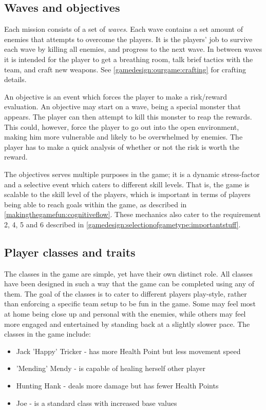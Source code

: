 \subsection{Waves and objectives}\label{gamedesign:ourgame:objectives}
Each mission consists of a set of \emph{waves}. Each wave contains a set amount of enemies that attempts to overcome the players. It is the players' job to survive each wave by killing all enemies, and progress to the next wave. In between waves it is intended for the player to get a breathing room, talk brief tactics with the team, and craft new weapons. See \ref{gamedesign:ourgame:crafting} for crafting details. 

An objective is an event which forces the player to make a risk/reward evaluation.
An objective may start on a wave, being a special monster that appears.
The player can then attempt to kill this monster to reap the rewards.
This could, however, force the player to go out into the open environment, making him more vulnerable and likely to be overwhelmed by enemies. The player has to make a quick analysis of whether or not the risk is worth the reward.

The objectives serves multiple purposes in the game; it is a dynamic
stress-factor and a selective event which caters to different skill levels.
That is, the game is scalable to the skill level of the players, which is important in terms of players being able to reach goals within the game, as described in \ref{makingthegamefun:cognitiveflow}.
These mechanics also cater to the requirement 2, 4, 5 and 6 described in \ref{gamedesign:selectionofgametype:importantstuff}.

\subsection{Player classes and traits}\label{gamedesign:ourgame:classes}
The classes in the game are simple, yet have their own distinct role.
All classes have been designed in such a way that the game can be completed using any of them.
The goal of the classes is to cater to different players play-style, rather than enforcing a specific team setup to be fun in the game.
Some may feel most at home being close up and personal with the enemies, while others may feel more engaged and entertained by standing back at a slightly slower pace.
The classes in the game include:

\begin{itemize}
\item Jack 'Happy' Tricker - has more Health Point but less movement speed
\item 'Mending' Mendy - is capable of healing herself other player
\item Hunting Hank - deals more damage but has fewer Health Points
\item Joe - is a standard class with increased base values
\end{itemize}

